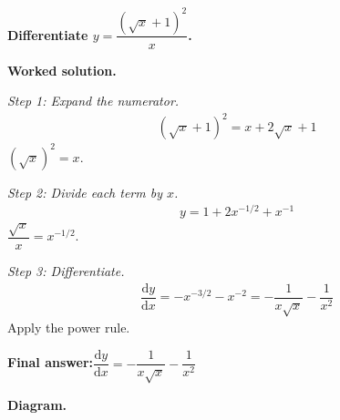 \documentclass[11pt]{article}
\newcommand{\question}[1]{\par\medskip\noindent\textbf{#1}\par}
\begin{document}
\question{Differentiate \( y = \dfrac{(\sqrt{x} + 1)^2}{x} \).}

\textbf{Worked solution.}

\textit{Step 1: Expand the numerator.}
\[\begin{gathered}
(\sqrt{x} + 1)^2 = x + 2\sqrt{x} + 1
\end{gathered}\]
\( (\sqrt{x})^2 = x \).

\textit{Step 2: Divide each term by \( x \).}
\[\begin{gathered}
y = 1 + 2x^{-1/2} + x^{-1}
\end{gathered}\]
\( \dfrac{\sqrt{x}}{x} = x^{-1/2} \).

\textit{Step 3: Differentiate.}
\[\begin{gathered}
\dfrac{\mathrm{d}y}{\mathrm{d}x} = -x^{-3/2} - x^{-2} = -\dfrac{1}{x\sqrt{x}} - \dfrac{1}{x^2}
\end{gathered}\]
Apply the power rule.

\begin{answerbox}
\textbf{Final answer:}\quad \(\displaystyle  \dfrac{\mathrm{d}y}{\mathrm{d}x} = -\dfrac{1}{x\sqrt{x}} - \dfrac{1}{x^2} \)
\end{answerbox}
\textbf{Diagram.}
\end{document}
